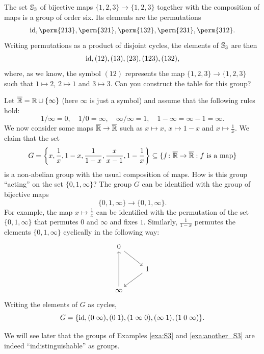 \begin{example}
\label{exa:S3}
The set $\mathbb{S}_3$ of bijective maps $\{1,2,3\}\to\{1,2,3\}$
together with the composition of maps is a group of order six. 
Its elements are the permutations 
        \[
        \id,\perm{213},\perm{321},\perm{132},\perm{231},\perm{312}.
        \]
        Writing 
        permutations as a product of disjoint cycles,  
        the elements of $\mathbb{S}_3$ 
        are then         
        \[
                \operatorname{id},(12),(13),(23),(123),(132),
        \]
        where, as we know, the symbol $(12)$ represents 
        the map $\{1,2,3\}\to\{1,2,3\}$ such that 
        $1\mapsto 2$, $2\mapsto 1$ and $3\mapsto 3$. 
        Can you construct the table for this group? 
\end{example}


\begin{example}
\label{exa:another_S3}
Let $\overline{\mathbb{R}}=\mathbb{R}\cup\{\infty\}$ (here $\infty$ is just a symbol) 
and assume that the following rules hold: 
\[
1/\infty=0,
\quad 1/0=\infty,
\quad \infty/\infty=1,
\quad 1-\infty=\infty-1=\infty.
\]
We now consider some maps $\overline{\mathbb{R}}\to\overline{\mathbb{R}}$ such as  
$x\mapsto x$, $x\mapsto 1-x$ and $x\mapsto\frac{1}{x}$. 
We claim that 
the set 
\[
G=\left\{x,\frac{1}{x},1-x,\frac{1}{1-x},\frac{x}{x-1},1-\frac{1}{x}\right\}
\subseteq\{f\colon\overline{\mathbb{R}}\to\overline{\mathbb{R}}:f\text{ is a map}\}
\]
is a non-abelian group with the usual composition of maps. How is this group ``acting'' on 
the set $\{0,1,\infty\}$? 
The group 
$G$ can be identified with the group of bijective maps 
\[
\{0,1,\infty\}\to\{0,1,\infty\}.
\]
For example, 
the map $x\mapsto\frac{1}{x}$ can be identified with the permutation of
the set 
$\{0,1,\infty\}$ that permutes $0$ and $\infty$ and fixes $1$. Similarly, 
$\frac{1}{1-x}$ permutes the elements $\{0,1,\infty\}$ cyclically 
in the following way:
\[
\begin{tikzcd}
        0 \\
        & 1 \\
        \infty
        \arrow[from=1-1, to=2-2]
        \arrow[from=2-2, to=3-1]
        \arrow[from=3-1, to=1-1]
\end{tikzcd}\]
Writing the elements of $G$ as cycles, 
\[
G=\{\operatorname{id},
(0\;\infty),
(0\;1),
(1\;\infty\;0),
(\infty\;1),
(1\;0\;\infty)\}.
\]
\end{example}

We will see later that the 
groups of Examples \ref{exa:S3} and \ref{exa:another_S3} are
indeed ``indistinguishable'' as groups. 

